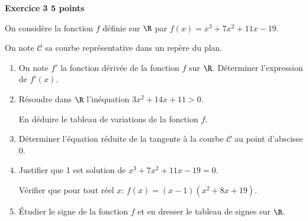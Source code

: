 \textbf{\large Exercice 3 \hfill 5 points}

\bigskip

On considère la fonction $f$ définie sur $\R$ par $f(x)=x^3 + 7x^2 +11x - 19$.

On note $\mathcal{C}$ sa courbe représentative dans un repère \Oij{} du plan.

\medskip

\begin{enumerate}
\item On note $f'$ la fonction dérivée de la fonction $f$ sur $\R$. Déterminer l'expression de $f'(x)$.
\item Résoudre dans $\R$ l'inéquation $3x^2+14x+11>0$.

En déduire le tableau de variations de la fonction $f$.
\item Déterminer l'équation réduite de la tangente à la courbe $\mathcal{C}$ au point d'abscisse $0$.
\item Justifier que 1 est solution de $x^3 + 7x^2 +11x - 19 = 0$.

Vérifier que pour tout réel $x$: $f(x) = (x-1) \left(x^2+8x+19\right)$.
\item Étudier le signe de la fonction $f$ et en dresser le tableau de signes sur $\R$.
\end{enumerate}

\vspace{0.5cm}

